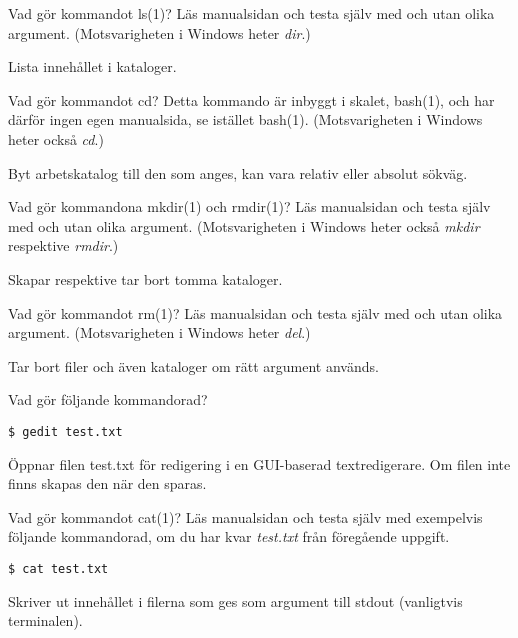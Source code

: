 \documentclass[a4paper]{miunasgn}
\begin{document}
\begin{questions}
	\question\label{q:ls}
	Vad gör kommandot ls(1)?
	Läs manualsidan och testa själv med och utan olika argument.
	(Motsvarigheten i Windows heter \emph{dir}.)
	\begin{solution}
		Lista innehållet i kataloger.
	\end{solution}

	\question\label{q:cd}
	Vad gör kommandot cd?
	Detta kommando är inbyggt i skalet, bash(1), och har därför ingen egen 
	manualsida, se istället bash(1).
	(Motsvarigheten i Windows heter också \emph{cd}.)
	\begin{solution}
		Byt arbetskatalog till den som anges, kan vara relativ eller absolut 
		sökväg.
	\end{solution}

	\question\label{q:mkdir}
	Vad gör kommandona mkdir(1) och rmdir(1)?
	Läs manualsidan och testa själv med och utan olika argument.
	(Motsvarigheten i Windows heter också \emph{mkdir} respektive \emph{rmdir}.)
	\begin{solution}
		Skapar respektive tar bort tomma kataloger.
	\end{solution}

	\question\label{q:rm}
	Vad gör kommandot rm(1)?
	Läs manualsidan och testa själv med och utan olika argument.
	(Motsvarigheten i Windows heter \emph{del}.)
	\begin{solution}
		Tar bort filer och även kataloger om rätt argument används.
	\end{solution}

	\question\label{q:gedit}
	Vad gör följande kommandorad?
	\begin{lstlisting}
$ gedit test.txt
	\end{lstlisting}
	\begin{solution}
		Öppnar filen test.txt för redigering i en GUI-baserad textredigerare.
		Om filen inte finns skapas den när den sparas.
	\end{solution}

	\question\label{q:cat}
	Vad gör kommandot cat(1)?
	Läs manualsidan och testa själv med exempelvis följande kommandorad, om du 
	har kvar \emph{test.txt} från föregående uppgift.
	\begin{lstlisting}
$ cat test.txt
	\end{lstlisting}
	\begin{solution}
		Skriver ut innehållet i filerna som ges som argument till stdout 
		(vanligtvis terminalen).
	\end{solution}


\end{questions}
\end{document}
